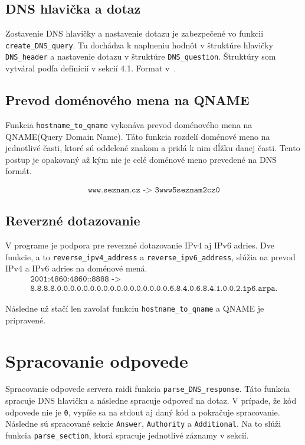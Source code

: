 \subsection{DNS hlavička a dotaz}
Zostavenie DNS hlavičky a nastavenie dotazu je zabezpečené vo funkcii \texttt{create\_DNS\_query}. Tu dochádza k naplneniu hodnôt v štruktúre hlavičky \texttt{DNS\_header} a nastavenie dotazu v štruktúre \texttt{DNS\_question}. Štruktúry som vytváral podľa definícií v sekcií 4.1. Format v~\cite{RFC1035}.

\subsection{Prevod doménového mena na QNAME}
Funkcia \texttt{hostname\_to\_qname} vykonáva prevod doménového mena na QNAME(Query Domain Name). Táto funkcia rozdelí doménové meno na jednotlivé časti, ktoré sú oddelené znakom  a pridá k nim dĺžku danej časti. Tento postup je opakovaný až kým nie je celé doménové meno prevedené na DNS formát.

\begin{gather*}
    \texttt{www.seznam.cz -> 3www5seznam2cz0}
\end{gather*}

\subsection{Reverzné dotazovanie}
V programe je podpora pre reverzné dotazovanie IPv4 aj IPv6 adries. Dve funkcie, a to \texttt{reverse\_ipv4\_address} a \texttt{reverse\_ipv6\_address}, slúžia na prevod IPv4 a IPv6 adries na doménové mená. 
\begin{gather*}
    \texttt{2001:4860:4860::8888 -> } \\ \texttt{8.8.8.8.0.0.0.0.0.0.0.0.0.0.0.0.0.0.0.0.0.6.8.4.0.6.8.4.1.0.0.2.ip6.arpa.}
\end{gather*}

\noindent Následne už stačí len zavolať funkciu \texttt{hostname\_to\_qname} a QNAME je pripravené.


\section{Spracovanie odpovede}
Spracovanie odpovede servera raidi funkcia \texttt{parse\_DNS\_response}. Táto funkcia spracuje DNS hlavičku a následne spracuje odpoveď na dotaz. V prípade, že kód odpovede nie je \texttt{0}, vypíše sa na stdout aj daný kód a pokračuje spracovanie. Následne sú spracované sekcie \texttt{Answer}, \texttt{Authority} a \texttt{Additional}. Na to slúži funkcia \texttt{parse\_section}, ktorá spracuje jednotlivé záznamy v sekcií.

